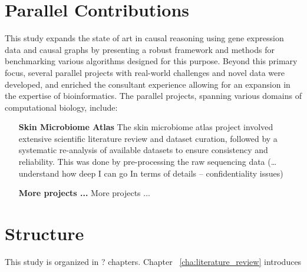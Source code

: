 \section{Parallel Contributions} %
\label{sec:parallel_contributions}

This study expands the state of art in causal reasoning using gene expression data and causal graphs by presenting a robust framework and methods for benchmarking various algorithms designed for this purpose. Beyond this primary focus, several parallel projects with real-world challenges and novel data were developed, and enriched the consultant experience allowing for an expansion in the expertise of bioinformatics. The parallel projects, spanning various domains of computational biology, include:

\begin{enumerate}
\item[\textbf{Skin Microbiome Atlas}] The skin microbiome atlas project involved extensive scientific literature review and dataset curation, followed by a systematic re-analysis of available datasets to ensure consistency and reliability. This was done by pre-processing the raw sequencing data (…understand how deep I can go In terms of details – confidentiality issues)
\item[\textbf{More projects ...}] More projects ...
\end{enumerate}

\section{Structure} %
\label{sec:structure}

This study is organized in ? chapters. Chapter ~\ref{cha:literature_review} introduces

